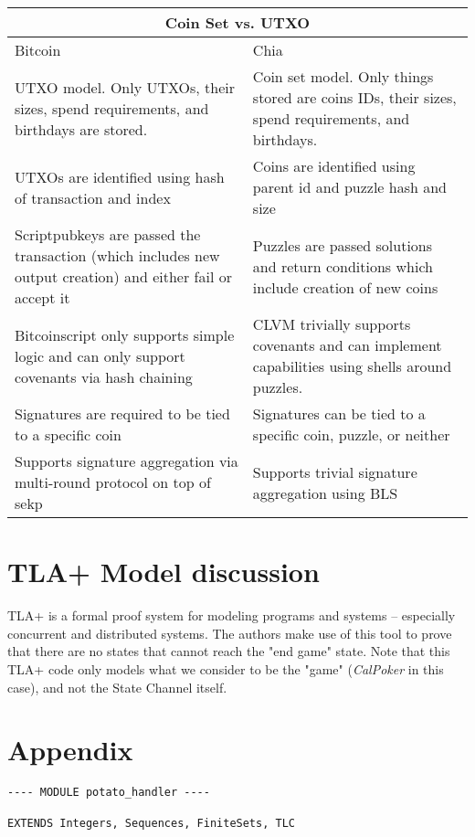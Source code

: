 \documentclass[a4paper]{article}
\begin{document}
\begin{multicols}{2}
\begin{tabular}{ |p{4cm}|p{4cm}|  }
 \hline
 \multicolumn{2}{|c|}{Coin Set vs. UTXO} \\
 \hline
 Bitcoin & Chia\\
 \hline\hline
 UTXO model. Only UTXOs, their sizes, spend requirements, and birthdays are stored. & Coin set model. Only things stored are coins IDs, their sizes, spend requirements, and birthdays.\\
 \hline
 UTXOs are identified using hash of transaction and index & Coins are identified using parent id and puzzle hash and size\\
 \hline
 Scriptpubkeys are passed the transaction (which includes new output creation) and either fail or accept it & Puzzles are passed solutions and return conditions which include creation of new coins\\
 \hline
 Bitcoinscript only supports simple logic and can only support covenants via hash chaining & CLVM trivially supports covenants and can implement capabilities using shells around puzzles.\\
 Signatures are required to be tied to a specific coin & Signatures can be tied to a specific coin, puzzle, or neither\\
 \hline
 Supports signature aggregation via multi-round protocol on top of sekp & Supports trivial signature aggregation using BLS\\
 \hline
\end{tabular}

\section{TLA+ Model discussion}

TLA+ \cite{2} is a formal proof system for modeling programs and systems -- especially concurrent and distributed systems. The authors make use of this tool to prove that there are no states that cannot reach the "end game" state. Note that this TLA+ code only models what we consider to be the "game" (\textit{CalPoker} in this case), and not the State Channel itself.

\section{Appendix}


\onecolumn
\begin{verbatim}
---- MODULE potato_handler ----

EXTENDS Integers, Sequences, FiniteSets, TLC


\end{verbatim}
\end{multicols}
\end{document}
